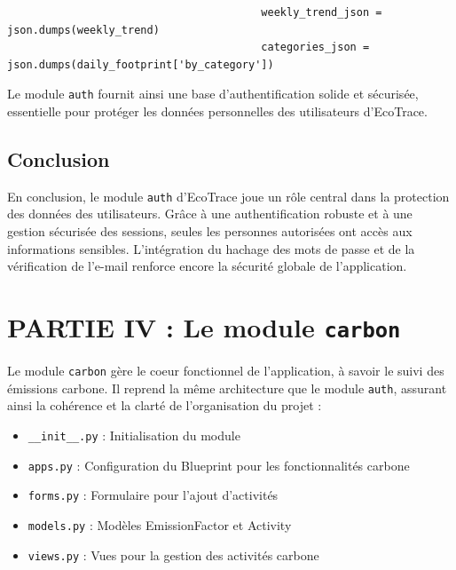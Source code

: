 \documentclass[a4paper,11pt]{article}
\begin{document}
\begin{enumerate}
\begin{itemize}
                                \begin{tcolorbox}[colback=lightgray!6, colframe=black, left=-60mm, right=5mm, top=2mm, bottom=0mm, boxrule=0.1mm]
                                    \begin{verbatim}
                                        weekly_trend_json = json.dumps(weekly_trend)
                                        categories_json = json.dumps(daily_footprint['by_category'])
                                    \end{verbatim}
                                \end{tcolorbox}
                        \end{itemize}
                \end{enumerate}

                \noindent Le module \texttt{auth} fournit ainsi une base d'authentification solide et sécurisée, essentielle pour protéger les données personnelles des utilisateurs d'EcoTrace.


            \subsection{Conclusion}
                \begin{tcolorbox}[colback=lightgray!6, colframe=black, left=2mm, right=5mm, top=2mm, bottom=0mm, boxrule=0.1mm]
                    En conclusion, le module \texttt{auth} d'EcoTrace joue un rôle central dans la protection des données des utilisateurs. Grâce à une authentification robuste et à une gestion sécurisée des sessions, seules les personnes autorisées ont accès aux informations sensibles. L'intégration du hachage des mots de passe et de la vérification de l'e-mail renforce encore la sécurité globale de l'application.
                \end{tcolorbox}


        \newpage
        \section{PARTIE IV : Le module \texttt{carbon}}
            \noindent Le module \texttt{carbon} gère le coeur fonctionnel de l'application, à savoir le suivi des émissions carbone. Il reprend la même architecture que le module \texttt{auth}, assurant ainsi la cohérence et la clarté de l'organisation du projet :

            \begin{itemize}
                \item \texttt{\_\_init\_\_.py} : Initialisation du module
                \item \texttt{apps.py} : Configuration du Blueprint pour les fonctionnalités carbone
                \item \texttt{forms.py} : Formulaire pour l'ajout d'activités
                \item \texttt{models.py} : Modèles EmissionFactor et Activity
                \item \texttt{views.py} : Vues pour la gestion des activités carbone
            \end{itemize}
\end{document}
